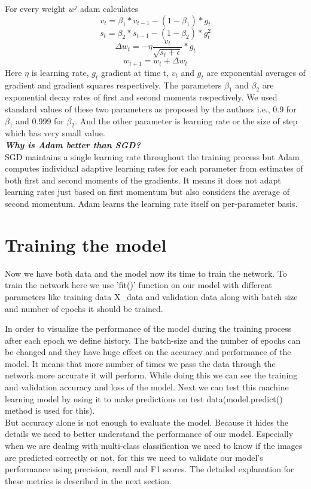 For every weight $w^j$ adam calculates
$$ v_t = \beta_1 * v_{t-1} - (1- \beta_1)* g_t $$
$$ s_t = \beta_2 * s_{t-1} - (1- \beta_2) * g_t^2 $$
$$ \Delta w_t = -\eta \frac{v_t}{\sqrt{s_t + \epsilon}} * g_t $$
$$ w_{t+1} = w_t + \Delta w_t $$
Here $\eta $ is learning rate, $g_t$ gradient at time t, $v_t$ and $g_t$ are exponential averages of gradient and gradient squares respectively. The parameters $\beta_1 $ and $\beta_2$ are exponential decay rates of first and second moments respectively. We used standard values of these two parameters as proposed by the authors i.e., 0.9 for $\beta_1$ and 0.999 for $\beta_2$. And the other parameter is learning rate or the size of step which has very small value. \cite{Diederik} \\
\noindent\textit{\textbf{Why is Adam better than SGD?}} \\
SGD maintains a single learning rate throughout the training process but Adam computes  individual adaptive learning rates for each parameter from estimates of both first and second moments of the gradients. It means it does not adapt learning rates just based on first momentum but also considers the average of second momentum. Adam learns the learning rate itself on per-parameter basis. 



\section{Training the model}
Now we have both data and the model now its time to train the network. To train the network here we use 'fit()' function on our model with different parameters like training data X\_data and validation data along with batch size and number of epochs it should be trained. 


\noindent In order to visualize the performance of the model during the training process after each epoch we define history. The batch-size and the number of epochs can be changed and they have huge effect on the accuracy and performance of the model. It means that more number of times we pass the data through the network more accurate it will perform. 
While doing this we can see the training and validation accuracy and loss of the model. Next we can test this machine learning model by using it to make predictions on test data(model.predict() method is used for this).\\ 
  But accuracy alone is not enough to evaluate the model. Because it hides the details we need to better understand the performance of our model. Especially when we are dealing with multi-class classification we need to know if the images are predicted correctly or not, for this we need to validate our model's performance using precision, recall and F1 scores. The detailed explanation for these metrics is described in the next section.


